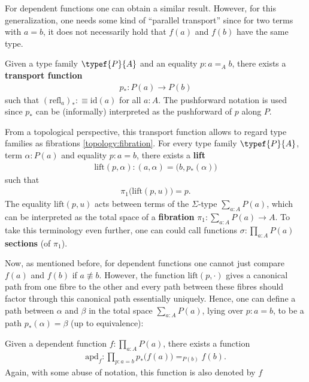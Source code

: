     For dependent functions one can obtain a similar result. However, for this generalization, one needs some kind of ``parallel transport'' since for two terms with $a=b$, it does not necessarily hold that $f(a)$ and $f(b)$ have the same type.
    \begin{property}[Transport]
        Given a type family $\typef{P}{A}$ and an equality $p:a=_Ab$, there exists a \textbf{transport function}
        \begin{gather}
            p_*:P(a)\rightarrow P(b)
        \end{gather}
        such that $(\mathrm{refl}_a)_*:\equiv\mathrm{id}(a)$ for all $a:A$. The pushforward notation is used since $p_*$ can be (informally) interpreted as the pushforward of $p$ along $P$.

        From a topological perspective, this transport function allows to regard type families as fibrations \ref{topology:fibration}. For every type family $\typef{P}{A}$, term $\alpha:P(a)$ and equality $p:a=b$, there exists a \textbf{lift}
        \begin{gather}
            \mathrm{lift}(p,\alpha):(a,\alpha) = \big(b,p_*(\alpha)\big)
        \end{gather}
        such that
        \begin{gather}
            \pi_1\big(\mathrm{lift}(p,u)\big)=p.
        \end{gather}
        The equality $\mathrm{lift}(p,u)$ acts between terms of the $\Sigma$-type $\sum_{a:A}P(a)$, which can be interpreted as the total space of a \textbf{fibration} $\pi_1:\sum_{a:A}P(a)\rightarrow A$. To take this terminology even further, one can could call functions $\sigma:\prod_{a:A}P(a)$ \textbf{sections} (of $\pi_1$).
    \end{property}
    Now, as mentioned before, for dependent functions one cannot just compare $f(a)$ and $f(b)$ if $a\not\equiv b$. However, the function $\mathrm{lift}(p,\cdot)$ gives a canonical path from one fibre to the other and every path between these fibres should factor through this canonical path essentially uniquely. Hence, one can define a path between $\alpha$ and $\beta$ in the total space $\sum_{a:A}P(a)$, lying over $p:a=b$, to be a path $p_*(\alpha)=\beta$ (up to equivalence):
    \begin{property}
        Given a dependent function $f:\prod_{a:A}P(a)$, there exists a function
        \begin{gather}
            \mathrm{apd}_f:\prod_{p:a=b}p_*\big(f(a)\big)=_{P(b)}f(b).
        \end{gather}
        Again, with some abuse of notation, this function is also denoted by $f$
    \end{property}

